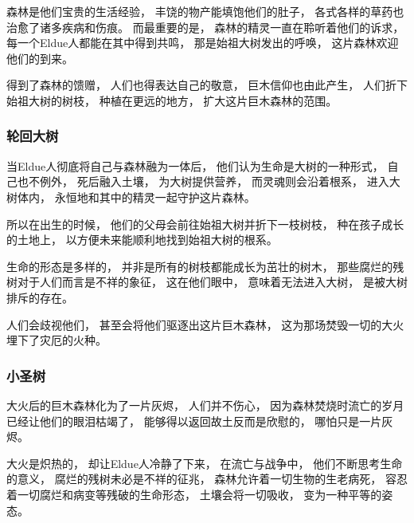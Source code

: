 \documentclass[UTF8,12pt,draft]{ctexbook}
\begin{document}
                森林是他们宝贵的生活经验，
                丰饶的物产能填饱他们的肚子，
                各式各样的草药也治愈了诸多疾病和伤痕。
                而最重要的是，
                森林的精灵一直在聆听着他们的诉求，
                每一个Eldue人都能在其中得到共鸣，
                那是始祖大树发出的呼唤，
                这片森林欢迎他们的到来。

                得到了森林的馈赠，
                人们也得表达自己的敬意，
                巨木信仰也由此产生，
                人们折下始祖大树的树枝，
                种植在更远的地方，
                扩大这片巨木森林的范围。
                \subsubsection{轮回大树}
                当Eldue人彻底将自己与森林融为一体后，
                他们认为生命是大树的一种形式，
                自己也不例外，
                死后融入土壤，
                为大树提供营养，
                而灵魂则会沿着根系，
                进入大树体内，
                永恒地和其中的精灵一起守护这片森林。

                所以在出生的时候，
                他们的父母会前往始祖大树并折下一枝树枝，
                种在孩子成长的土地上，
                以方便未来能顺利地找到始祖大树的根系。

                生命的形态是多样的，
                并非是所有的树枝都能成长为茁壮的树木，
                那些腐烂的残树对于人们而言是不祥的象征，
                这在他们眼中，
                意味着无法进入大树，
                是被大树排斥的存在。
                
                人们会歧视他们，
                甚至会将他们驱逐出这片巨木森林，
                这为那场焚毁一切的大火埋下了灾厄的火种。
                \subsubsection{小圣树}
                大火后的巨木森林化为了一片灰烬，
                人们并不伤心，
                因为森林焚烧时流亡的岁月已经让他们的眼泪枯竭了，
                能够得以返回故土反而是欣慰的，
                哪怕只是一片灰烬。

                大火是炽热的，
                却让Eldue人冷静了下来，
                在流亡与战争中，
                他们不断思考生命的意义，
                腐烂的残树未必是不祥的征兆，
                森林允许着一切生物的生老病死，
                容忍着一切腐烂和病变等残破的生命形态，
                土壤会将一切吸收，
                变为一种平等的姿态。
\end{document}
